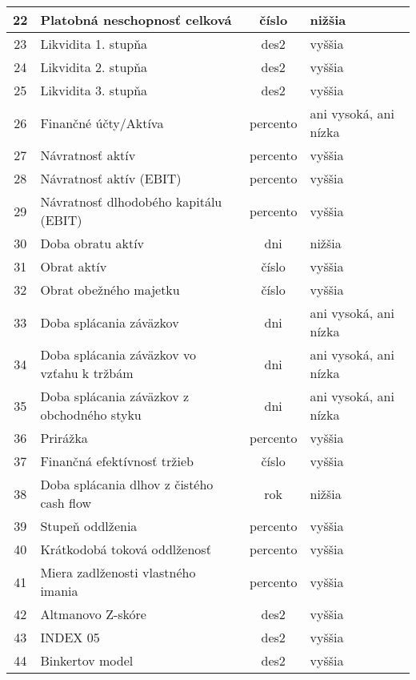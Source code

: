 \begin{longtable}{ |c|p{7cm}|c|p{2.4cm}| }
        \hline
        22 & Platobná neschopnosť celková & číslo & nižšia \\
        \hline
        23 & Likvidita 1. stupňa & des2 & vyššia \\
        \hline
        24 & Likvidita 2. stupňa & des2 & vyššia \\
        \hline
        25 & Likvidita 3. stupňa & des2 & vyššia \\
        \hline
        26 & Finančné účty/Aktíva & percento & ani vysoká, ani nízka \\
        \hline
        27 & Návratnosť aktív & percento & vyššia \\
        \hline
        28 & Návratnosť aktív (EBIT) & percento & vyššia \\
        \hline
        29 & Návratnosť dlhodobého kapitálu (EBIT) & percento & vyššia \\
        \hline
        30 & Doba obratu aktív & dni & nižšia \\
        \hline
        31 & Obrat aktív & číslo & vyššia \\
        \hline
        32 & Obrat obežného majetku & číslo & vyššia \\
        \hline
        33 & Doba splácania záväzkov & dni & ani vysoká, ani nízka \\
        \hline
        34 & Doba splácania záväzkov vo vzťahu k tržbám & dni & ani vysoká, ani nízka \\
        \hline
        35 & Doba splácania záväzkov z obchodného styku & dni & ani vysoká, ani nízka \\
        \hline
        36 & Prirážka & percento & vyššia \\
        \hline
        37 & Finančná efektívnosť tržieb & číslo & vyššia \\
        \hline
        38 & Doba splácania dlhov z čistého cash flow & rok & nižšia \\
        \hline
        39 & Stupeň oddlženia & percento & vyššia \\
        \hline
        40 & Krátkodobá toková oddlženosť & percento & vyššia \\
        \hline
        41 & Miera zadlženosti vlastného imania & percento & vyššia \\
        \hline
        42 & Altmanovo Z-skóre & des2 & vyššia \\
        \hline
        43 & INDEX 05 & des2 & vyššia \\
        \hline
        44 & Binkertov model & des2 & vyššia \\

\end{longtable}

